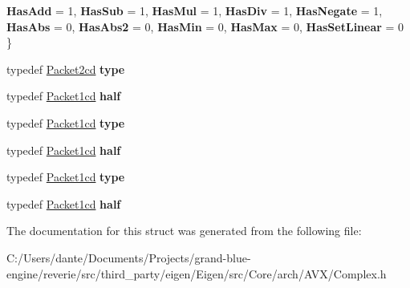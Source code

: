 \begin{DoxyCompactItemize}
\newline
{\bfseries Has\+Add} = 1, 
{\bfseries Has\+Sub} = 1, 
{\bfseries Has\+Mul} = 1, 
{\bfseries Has\+Div} = 1, 
\newline
{\bfseries Has\+Negate} = 1, 
{\bfseries Has\+Abs} = 0, 
{\bfseries Has\+Abs2} = 0, 
{\bfseries Has\+Min} = 0, 
\newline
{\bfseries Has\+Max} = 0, 
{\bfseries Has\+Set\+Linear} = 0
 \}
\item 
\mbox{\label{struct_eigen_1_1internal_1_1packet__traits_3_01std_1_1complex_3_01double_01_4_01_4_a7634eba4586ad4f9ad7cb2766ba2060d}} 
typedef \mbox{\hyperlink{struct_eigen_1_1internal_1_1_packet2cd}{Packet2cd}} {\bfseries type}
\item 
\mbox{\label{struct_eigen_1_1internal_1_1packet__traits_3_01std_1_1complex_3_01double_01_4_01_4_a0ade4ea2669a629eea68ae4b656894c9}} 
typedef \mbox{\hyperlink{struct_eigen_1_1internal_1_1_packet1cd}{Packet1cd}} {\bfseries half}
\item 
\mbox{\label{struct_eigen_1_1internal_1_1packet__traits_3_01std_1_1complex_3_01double_01_4_01_4_aa201000fa7adc5d0ff2556c0b138f0e2}} 
typedef \mbox{\hyperlink{struct_eigen_1_1internal_1_1_packet1cd}{Packet1cd}} {\bfseries type}
\item 
\mbox{\label{struct_eigen_1_1internal_1_1packet__traits_3_01std_1_1complex_3_01double_01_4_01_4_a0ade4ea2669a629eea68ae4b656894c9}} 
typedef \mbox{\hyperlink{struct_eigen_1_1internal_1_1_packet1cd}{Packet1cd}} {\bfseries half}
\item 
\mbox{\label{struct_eigen_1_1internal_1_1packet__traits_3_01std_1_1complex_3_01double_01_4_01_4_aa201000fa7adc5d0ff2556c0b138f0e2}} 
typedef \mbox{\hyperlink{struct_eigen_1_1internal_1_1_packet1cd}{Packet1cd}} {\bfseries type}
\item 
\mbox{\label{struct_eigen_1_1internal_1_1packet__traits_3_01std_1_1complex_3_01double_01_4_01_4_a0ade4ea2669a629eea68ae4b656894c9}} 
typedef \mbox{\hyperlink{struct_eigen_1_1internal_1_1_packet1cd}{Packet1cd}} {\bfseries half}
\end{DoxyCompactItemize}


The documentation for this struct was generated from the following file\+:\begin{DoxyCompactItemize}
\item 
C\+:/\+Users/dante/\+Documents/\+Projects/grand-\/blue-\/engine/reverie/src/third\+\_\+party/eigen/\+Eigen/src/\+Core/arch/\+A\+V\+X/Complex.\+h\end{DoxyCompactItemize}
